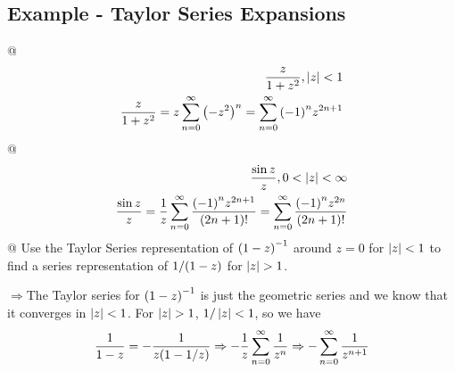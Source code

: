     \subsection{Example - Taylor Series Expansions}
    \begin{easylist}[itemize]
        @ \begin{align*}
            \frac{z}{1+z^2}, \left\lvert z \right\rvert < 1\\
            \frac{z}{1+z^2} = z \sum_{n=0}^\infty {\left( -z^2 \right)}^n
            = \sum_{n=0}^\infty {\left( -1 \right)}^n z^{2n+1}
        \end{align*}
        @ \begin{align*}
            \frac{\sin z}{z} , 0 < \left\lvert z \right\rvert < \infty\\
            \frac{\sin z}{z} =
            \frac{1}{z} \sum_{n=0}^\infty \frac{{\left( -1 \right)}^n z^{2n + 1}}{{\left( 2n+1 \right)}!} =
            \sum_{n=0}^\infty \frac{{\left( -1 \right)}^n z^{2n}}{{\left( 2n+1 \right)}!}
        \end{align*}
        @ Use the Taylor Series representation of ${\left( 1-z \right)}^{-1}$ around
        $z=0$ for $\left\lvert z \right\rvert<1$ to find a series representation of
        $1/{\left( 1-z \right)}$ for $\left\lvert z \right\rvert>1$.

        $\Rightarrow$The Taylor series for ${\left( 1-z \right)}^{-1}$ is just the geometric series
        and we know that it converges in $\left\lvert z \right\rvert<1$. For $\left\lvert z \right\rvert>1$,
        $1/\left\lvert z \right\rvert < 1$, so we have
        \begin{align*}
            \frac{1}{1-z} = -\frac{1}{z{\left( 1-1/z \right)}}\Rightarrow
            -\frac{1}{z}\sum_{n=0}^\infty \frac{1}{z^n}\Rightarrow
            -\sum_{n=0}^\infty \frac{1}{z^{n+1}}
        \end{align*}
    \end{easylist}


